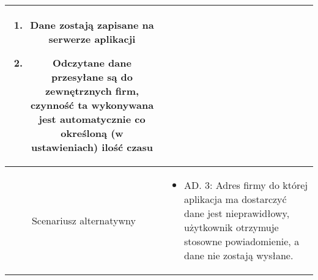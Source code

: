 \documentclass{article}
\begin{document}
\begin{enumerate}
\begin{enumerate}
\begin{table}[H]
\begin{tabular}{|c|p{7cm}|}
\begin{enumerate}
\item Dane zostają zapisane na serwerze aplikacji

\item Odczytane dane przesyłane są do zewnętrznych firm, czynność ta wykonywana jest automatycznie co określoną (w ustawieniach) ilość czasu\end{enumerate} \\
						\hline
						Scenariusz alternatywny & \begin{itemize}\item AD. 3: Adres firmy do której aplikacja ma dostarczyć dane jest nieprawidłowy, użytkownik otrzymuje stosowne powiadomienie, a dane nie zostają wysłane.\end{itemize}                                                                                                                                  \\
						\hline
					\end{tabular}
				\end{table}
		\end{enumerate}


\end{enumerate}
\end{document}
